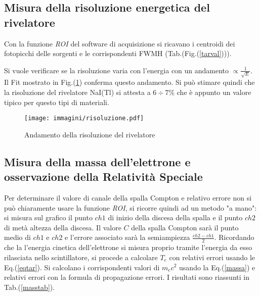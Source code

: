 \documentclass[12pt,a4paper,openright,twoside]{article}
\numberwithin{equation}{section} %
\begin{document}
\subsection{Misura della risoluzione energetica del rivelatore}

Con la funzione \textit{ROI} del software di acquisizione si ricavano i centroidi dei fotopicchi delle sorgenti e le corrispondenti FWMH (Tab.(Fig.(\ref{tarval}))).

 Si vuole verificare se la risoluzione varia con l'energia con un andamento $\propto \frac{1}{\sqrt{E}} $. Il Fit mostrato in Fig.(\ref{risfig}) conferma questo andamento. Si può stimare quindi che la risoluzione del rivelatore NaI(Tl) si attesta a $6 \div 7 \% $ che è appunto un valore tipico per questo tipi di materiali.

\begin{figure}[hbtp]
\centering
\texttt{[image: immagini/risoluzione.pdf]}
\caption{Andamento della risoluzione del rivelatore}
\label{risfig}
\end{figure}

\pagebreak

\subsection{Misura della massa dell'elettrone e osservazione della Relatività Speciale} \label{rel}

Per determinare il valore di canale della spalla Compton e relativo errore non si può chiaramente usare la funzione \textit{ROI}, si ricorre quindi ad un metodo "a mano": si misura sul grafico il punto $ch1$ di inizio della discesa della spalla e il punto $ch2$ di metà altezza della discesa.
Il valore $C$ della  spalla Compton sarà il punto medio di $ch1$ e $ch2$ e l'errore associato sarà la semiampiezza $\frac{ch2-ch1}{2}$.
Ricordando che la l'energia cinetica dell'elettrone si misura proprio tramite l'energia da esso rilasciata nello scintillatore, si procede a calcolare $T_e$ con relativi errori usando le Eq.(\ref{eqtar}).
Si calcolano i corrispondenti valori di $m_e c^2$ usando la Eq.(\ref{massa}) e relativi errori con la formula di propagazione errori. 
I risultati sono riassunti in Tab.(\ref{masstab}).
\end{document}
